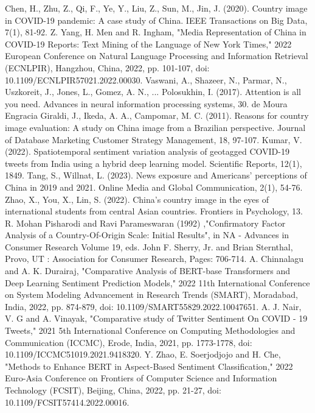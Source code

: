 \documentclass[conference]{IEEEtran}
\begin{document}
\begin{thebibliography}{00}
	 Chen, H., Zhu, Z., Qi, F., Ye, Y., Liu, Z., Sun, M.,  Jin, J. (2020). Country image in COVID-19 pandemic: A case study of China. IEEE Transactions on Big Data, 7(1), 81-92. 
	 Z. Yang, H. Men and R. Ingham, "Media Representation of China in COVID-19 Reports: Text Mining of the Language of New York Times," 2022 European Conference on Natural Language Processing and Information Retrieval (ECNLPIR), Hangzhou, China, 2022, pp. 101-107, doi: 10.1109/ECNLPIR57021.2022.00030. 
	 Vaswani, A., Shazeer, N., Parmar, N., Uszkoreit, J., Jones, L., Gomez, A. N., ...  Polosukhin, I. (2017). Attention is all you need. Advances in neural information processing systems, 30. 
	de Moura Engracia Giraldi, J., Ikeda, A. A.,  Campomar, M. C. (2011). Reasons for country image evaluation: A study on China image from a Brazilian perspective. Journal of Database Marketing  Customer Strategy Management, 18, 97-107. 
	 Kumar, V. (2022). Spatiotemporal sentiment variation analysis of geotagged COVID-19 tweets from India using a hybrid deep learning model. Scientific Reports, 12(1), 1849. 
	 Tang, S.,  Willnat, L. (2023). News exposure and Americans’ perceptions of China in 2019 and 2021. Online Media and Global Communication, 2(1), 54-76. 
	 Zhao, X., You, X.,  Lin, S. (2022). China's country image in the eyes of international students from central Asian countries. Frontiers in Psychology, 13. 
	 R. Mohan Pisharodi and Ravi Parameswaran (1992) ,"Confirmatory Factor Analysis of a Country-Of-Origin Scale: Initial Results", in NA - Advances in Consumer Research Volume 19, eds. John F. Sherry, Jr. and Brian Sternthal, Provo, UT : Association for Consumer Research, Pages: 706-714. 
	 A. Chinnalagu and A. K. Durairaj, "Comparative Analysis of BERT-base Transformers and Deep Learning Sentiment Prediction Models," 2022 11th International Conference on System Modeling  Advancement in Research Trends (SMART), Moradabad, India, 2022, pp. 874-879, doi: 10.1109/SMART55829.2022.10047651.
	 A. J. Nair, V. G and A. Vinayak, "Comparative study of Twitter Sentiment On COVID - 19 Tweets," 2021 5th International Conference on Computing Methodologies and Communication (ICCMC), Erode, India, 2021, pp. 1773-1778, doi: 10.1109/ICCMC51019.2021.9418320. 
	 Y. Zhao, E. Soerjodjojo and H. Che, "Methods to Enhance BERT in Aspect-Based Sentiment Classification," 2022 Euro-Asia Conference on Frontiers of Computer Science and Information Technology (FCSIT), Beijing, China, 2022, pp. 21-27, doi: 10.1109/FCSIT57414.2022.00016. 

\end{thebibliography}
\end{document}
